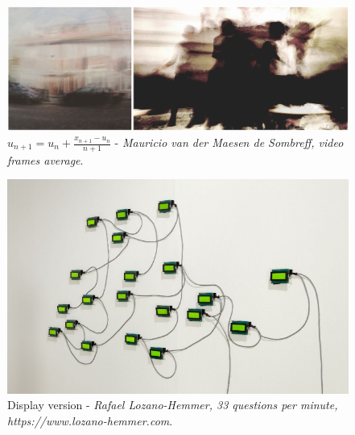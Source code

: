 \begin{figure}
    \centering
    \includegraphics[width=0.8\linewidth]{assets/average.png} 
    \caption{\small \( u_{n+1} = u_{n} + \frac{x_{n+1} - u_{n}}{n+1} \) - \textit{Mauricio van der Maesen de Sombreff, video frames average}.}
    \label{fig:mv01}
\end{figure}

\begin{figure}
    \centering
    \includegraphics[width=0.8\linewidth]{assets/33_questions_per_minute_grifo.png} 
    \caption{\small Display version - \textit{Rafael Lozano-Hemmer, 33 questions per minute, https://www.lozano-hemmer.com}.}
    \label{fig:lozano}
\end{figure}

